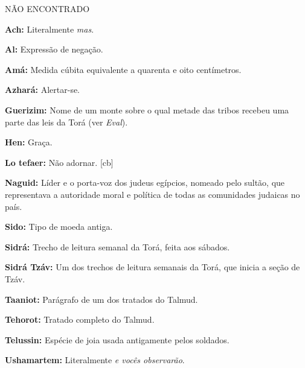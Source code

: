 NÃO ENCONTRADO

\textbf{Ach:} Literalmente \emph{mas}.

\textbf{Al:} Expressão de negação.

\textbf{Amá:} Medida cúbita equivalente a quarenta e oito centímetros.

\textbf{Azhará:} Alertar-se.

\textbf{Guerizim:} Nome de um monte sobre o qual metade das tribos recebeu uma 
parte das leis da Torá (ver \emph{Eval}).

\textbf{Hen:} Graça.

\textbf{Lo tefaer:} Não adornar. [cb]

\textbf{Naguid:} Líder e o porta-voz dos judeus egípcios,
nomeado pelo sultão, que representava a autoridade moral e política
de todas as comunidades judaicas no país.

\textbf{Sido:} Tipo de moeda antiga.

\textbf{Sidrá:} Trecho de leitura semanal da Torá, feita aos sábados.

\textbf{Sidrá Tzáv:} Um dos trechos de leitura semanais da Torá, 
que inicia a seção de Tzáv.

\textbf{Taaniot:} Parágrafo de um dos tratados do Talmud.

\textbf{Tehorot:} Tratado completo do Talmud.

\textbf{Telussin:} Espécie de joia usada antigamente pelos soldados.

\textbf{Ushamartem:} Literalmente \emph{e vocês observarão}.

